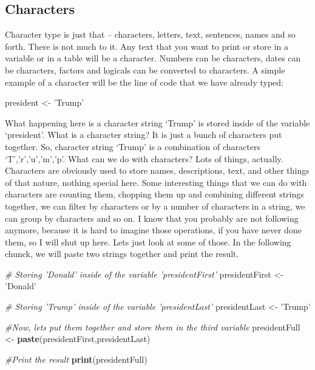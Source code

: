 \documentclass[]{book}
\newenvironment{Shaded}{\begin{snugshade}}{\end{snugshade}}
\newcommand{\CommentTok}[1]{\textcolor[rgb]{0.56,0.35,0.01}{\textit{#1}}}
\newcommand{\KeywordTok}[1]{\textcolor[rgb]{0.13,0.29,0.53}{\textbf{#1}}}
\newcommand{\NormalTok}[1]{#1}
\newcommand{\StringTok}[1]{\textcolor[rgb]{0.31,0.60,0.02}{#1}}
\begin{document}
\hypertarget{characters}{%
\subsection{Characters}\label{characters}}

Character type is just that -- characters, letters, text, sentences, names and so forth. There is not much to it. Any text that you want to print or store in a variable or in a table will be a character. Numbers can be characters, dates can be characters, factors and logicals can be converted to characters. A simple example of a character will be the line of code that we have already typed:

\begin{Shaded}
\begin{Highlighting}[]
\NormalTok{president <-}\StringTok{ 'Trump'}
\end{Highlighting}
\end{Shaded}

What happening here is a character string `Trump' is stored inside of the variable `president'. What is a character string? It is just a bunch of characters put together. So, character string `Trump' is a combination of characters `T','r','u','m','p'. What can we do with characters? Lots of things, actually. Characters are obviously used to store names, descriptions, text, and other things of that nature, nothing special here. Some interesting things that we can do with characters are counting them, chopping them up and combining different strings together, we can filter by characters or by a number of characters in a string, we can group by characters and so on. I know that you probably are not following anymore, because it is hard to imagine those operations, if you have never done them, so I will shut up here. Lets just look at some of those. In the following chunck, we will paste two strings together and print the result.

\begin{Shaded}
\begin{Highlighting}[]
\CommentTok{# Storing 'Donald' inside of the variable 'presidentFirst'}
\NormalTok{presidentFirst <-}\StringTok{ 'Donald'}

\CommentTok{# Storing 'Trump' inside of the variable 'presidentLast'}
\NormalTok{presidentLast <-}\StringTok{ 'Trump'}

\CommentTok{#Now, lets put them together and store them in the third variable}
\NormalTok{presidentFull <-}\StringTok{ }\KeywordTok{paste}\NormalTok{(presidentFirst,presidentLast)}

\CommentTok{#Print the result}
\KeywordTok{print}\NormalTok{(presidentFull)}
\end{Highlighting}
\end{Shaded}
\end{document}
